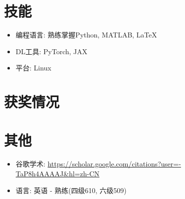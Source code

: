 \documentclass{resume}
\begin{document}
\section{\faCogs\quad 技能}
\begin{itemize}[parsep=0.5ex]
  \item 编程语言: 熟练掌握Python, MATLAB, \LaTeX\
  \item DL工具: PyTorch, JAX
  \item 平台: Linux
\end{itemize}

\section{\faHeartO\quad 获奖情况}

\section{\faInfo\quad 其他}
\begin{itemize}[parsep=0.5ex]
  \item 谷歌学术: \url{https://scholar.google.com/citations?user=-TaP8h4AAAAJ&hl=zh-CN}
  \item 语言: 英语 - 熟练(四级610, 六级509)
\end{itemize}

%
%
\end{document}
